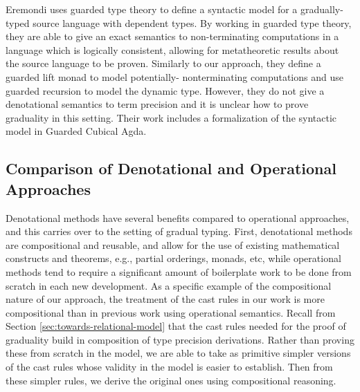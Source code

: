 Eremondi \cite{Eremondi_2023} uses guarded type theory to
define a syntactic model for a gradually-typed source
language with dependent types. By working in guarded type theory, they are
able to give an exact semantics to non-terminating computations in a language
which is logically consistent, allowing for metatheoretic results about the
source language to be proven.
%
Similarly to our approach, they define a guarded lift monad to model potentially-
nonterminating computations and use guarded recursion to model the dynamic type.
However, they do not give a denotational semantics to term precision and it is unclear
how to prove graduality in this setting.
Their work includes a formalization of the syntactic model in Guarded Cubical Agda.

\subsection{Comparison of Denotational and Operational Approaches}

Denotational methods have several benefits compared to operational approaches,
and this carries over to the setting of gradual typing. First, denotational
methods are compositional and reusable, and allow for the use of existing
mathematical constructs and theorems, e.g., partial orderings, monads, etc,
while operational methods tend to require a significant amount of boilerplate
work to be done from scratch in each new development.
%
As a specific example of the compositional nature of our approach, the treatment
of the cast rules in our work is more compositional than in previous work using
operational semantics. Recall from Section \ref{sec:towards-relational-model}
that the cast rules needed for the proof of graduality build in composition of
type precision derivations. Rather than proving these from scratch in the model,
we are able to take as primitive simpler versions of the cast rules whose
validity in the model is easier to establish. Then from these simpler rules, we
derive the original ones using compositional reasoning.

